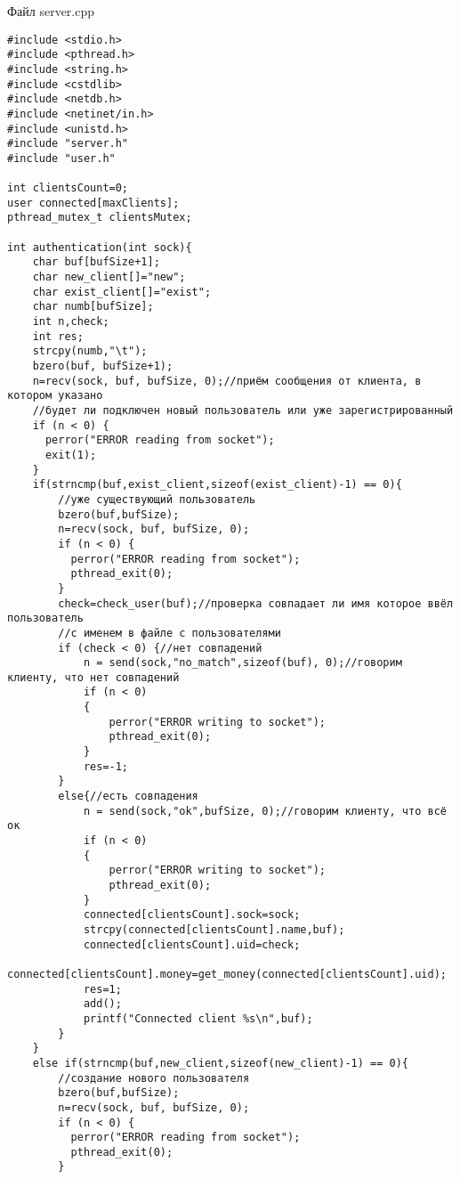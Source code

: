 \documentclass[12pt,a4paper]{report}
\begin{document}
Файл server.cpp
\begin{lstlisting}
#include <stdio.h>
#include <pthread.h>
#include <string.h>
#include <cstdlib>
#include <netdb.h>
#include <netinet/in.h>
#include <unistd.h>
#include "server.h"
#include "user.h"

int clientsCount=0;
user connected[maxClients];
pthread_mutex_t clientsMutex;

int authentication(int sock){
    char buf[bufSize+1];
    char new_client[]="new";
    char exist_client[]="exist";
    char numb[bufSize];
    int n,check;
    int res;
    strcpy(numb,"\t");
    bzero(buf, bufSize+1);
    n=recv(sock, buf, bufSize, 0);//приём сообщения от клиента, в котором указано
    //будет ли подключен новый пользователь или уже зарегистрированный
    if (n < 0) {
      perror("ERROR reading from socket");
      exit(1);
    }
    if(strncmp(buf,exist_client,sizeof(exist_client)-1) == 0){
        //уже существующий пользователь
        bzero(buf,bufSize);
        n=recv(sock, buf, bufSize, 0);
        if (n < 0) {
          perror("ERROR reading from socket");
          pthread_exit(0);
        }
        check=check_user(buf);//проверка совпадает ли имя которое ввёл пользователь
        //с именем в файле с пользователями
        if (check < 0) {//нет совпадений
            n = send(sock,"no_match",sizeof(buf), 0);//говорим клиенту, что нет совпадений
            if (n < 0)
            {
                perror("ERROR writing to socket");
                pthread_exit(0);
            }
            res=-1;
        }
        else{//есть совпадения
            n = send(sock,"ok",bufSize, 0);//говорим клиенту, что всё ок
            if (n < 0)
            {
                perror("ERROR writing to socket");
                pthread_exit(0);
            }
            connected[clientsCount].sock=sock;
            strcpy(connected[clientsCount].name,buf);
            connected[clientsCount].uid=check;
            connected[clientsCount].money=get_money(connected[clientsCount].uid);
            res=1;
            add();
            printf("Connected client %s\n",buf);
        }
    }
    else if(strncmp(buf,new_client,sizeof(new_client)-1) == 0){
        //создание нового пользователя
        bzero(buf,bufSize);
        n=recv(sock, buf, bufSize, 0);
        if (n < 0) {
          perror("ERROR reading from socket");
          pthread_exit(0);
        }


\end{lstlisting}
\end{document}
